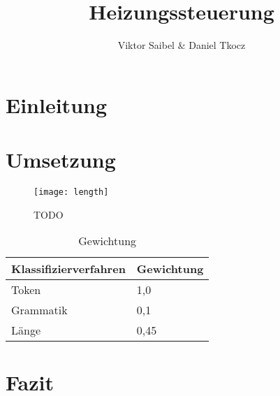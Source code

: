 \documentclass[a4paper]{article}
\newcommand*{\thead}[1]{\multicolumn{1}{c}{\bfseries #1}}
\begin{document}
\title{Heizungssteuerung}
\author{Viktor Saibel \& Daniel Tkocz}
\maketitle

\newpage

\tableofcontents

\newpage

\section{Einleitung}
\section{Umsetzung}
\begin{figure}[h!]
\centering
\texttt{[image: length]}
\caption{TODO}
\label{fig:length}
\end{figure}

\begin{table}[h!]
\centering
\begin{tabular}{|l|l|}
\thead{Klassifizierverfahren} & \thead{Gewichtung}\\\hline
Token & 1,0\\\hline
Grammatik & 0,1\\\hline
Länge & 0,45\\\hline
\end{tabular}
\caption{Gewichtung}
\label{tab:weights}
\end{table}
\section{Fazit}
\end{document}
